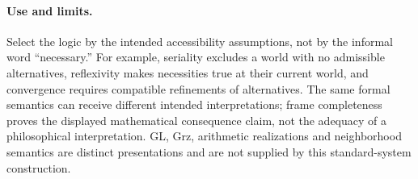 \paragraph{Use and limits.}
Select the logic by the intended accessibility assumptions, not by the
informal word ``necessary.'' For example, seriality excludes a world with
no admissible alternatives, reflexivity makes necessities true at their
current world, and convergence requires compatible refinements of
alternatives. The same formal semantics can receive different intended
interpretations; frame completeness proves the displayed mathematical
consequence claim, not the adequacy of a philosophical interpretation.
GL, Grz, arithmetic realizations and neighborhood semantics are distinct
presentations and are not supplied by this standard-system construction.
